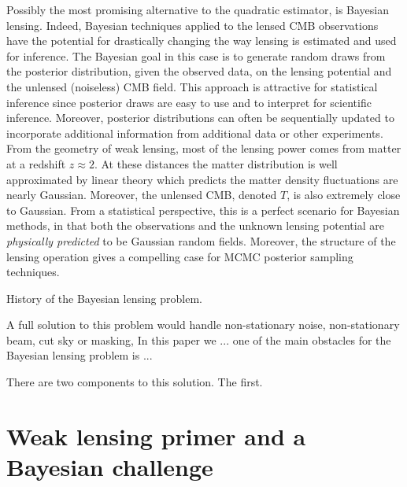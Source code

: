 \documentclass[noinfoline]{imsart}
\begin{document}
 Possibly the most promising alternative to the quadratic estimator, is Bayesian lensing. Indeed, Bayesian techniques applied to the lensed CMB observations have the potential for drastically changing the way lensing is estimated and used for inference. The Bayesian goal in this case is to generate random draws from the posterior distribution, given the observed data, on the lensing potential and the unlensed (noiseless) CMB field. This approach is attractive for statistical inference since posterior draws are easy to use and to interpret for scientific inference. Moreover, posterior distributions can often be sequentially updated to incorporate additional information from additional data or other experiments.
 From the geometry of weak lensing, most of the lensing power comes from matter at a redshift $z\approx 2$. At these distances the matter distribution is well approximated by linear theory which predicts the matter density fluctuations are nearly Gaussian. Moreover, the unlensed CMB, denoted  $T$, is also extremely close to Gaussian.  From a statistical perspective, this is a perfect scenario for Bayesian methods, in that both the observations and the unknown lensing potential are {\em physically predicted} to be Gaussian random fields.  Moreover, the structure of the lensing operation gives a compelling case for MCMC posterior sampling techniques.
 


History of the Bayesian lensing problem.

A full solution to this problem would handle non-stationary noise, non-stationary beam, cut sky or masking, In this paper we ... one of the main obstacles for the Bayesian lensing problem is ...

There are two components to this solution. The first.




%
%
\section{Weak lensing primer and a Bayesian challenge}
\label{primer}
\end{document}
